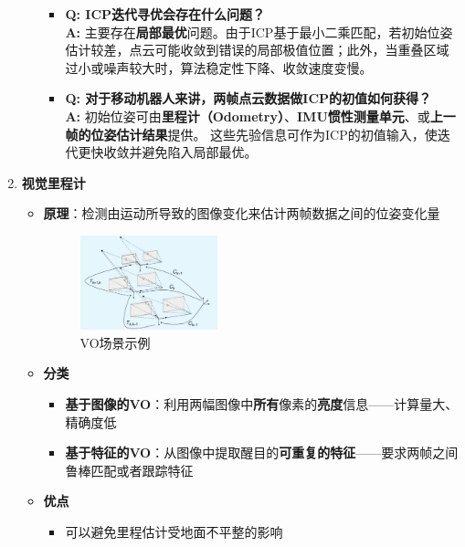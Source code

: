 \documentclass[../main.tex]{subfiles}
\begin{document}
\begin{enumerate}
\begin{itemize}
\begin{itemize}
        
            \item \textbf{Q: ICP迭代寻优会存在什么问题？} \\
            \textbf{A:} 主要存在\textbf{局部最优}问题。由于ICP基于最小二乘匹配，若初始位姿估计较差，点云可能收敛到错误的局部极值位置；此外，当重叠区域过小或噪声较大时，算法稳定性下降、收敛速度变慢。
        
            \item \textbf{Q: 对于移动机器人来讲，两帧点云数据做ICP的初值如何获得？} \\
            \textbf{A:} 初始位姿可由\textbf{里程计（Odometry）}、\textbf{IMU惯性测量单元}、或\textbf{上一帧的位姿估计结果}提供。  
            这些先验信息可作为ICP的初值输入，使迭代更快收敛并避免陷入局部最优。
        \end{itemize}
    \end{itemize}
    \item \textbf{视觉里程计}\label{visual}
        \begin{itemize}
            \item \textbf{原理}：检测由运动所导致的图像变化来估计两帧数据之间的位姿变化量
                    \begin{figure}[H]
                        \centering
                        \includegraphics[width=0.4\textwidth]{images/vo.png}
                        \caption{VO场景示例}
                    \end{figure}
            \item \textbf{分类}
                \begin{itemize}
                    \item \textbf{基于图像的VO}：利用两幅图像中\textbf{所有}像素的\textbf{亮度}信息——计算量大、精确度低
                    \item \textbf{基于特征的VO}：从图像中提取醒目的\textbf{可重复的特征}——要求两帧之间鲁棒匹配或者跟踪特征
                \end{itemize}
            \item \textbf{优点}
                \begin{itemize}
                    \item 可以避免里程估计受地面不平整的影响

\end{itemize}
\end{itemize}
\end{enumerate}
\end{document}
